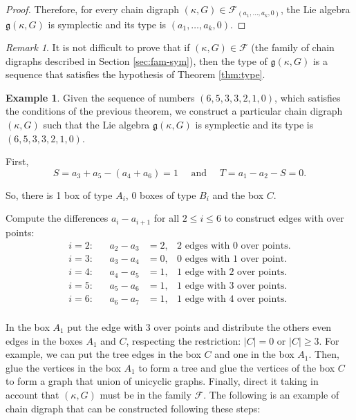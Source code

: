 \documentclass[a4paper,11pt]{amsart}
\theoremstyle{definition}
\newtheorem{example}[theorem]{Example}
\theoremstyle{remark}
\newtheorem{remark}[theorem]{Remark}
\numberwithin{equation}{section}
\newcommand{\g}{\mathfrak{g}}
\newcommand{\F}{\mathcal{F}}
\begin{document}
\begin{proof}
Therefore, for every chain digraph \((\kappa,G)\in\F_{(a_1,\dots,a_k,0)}\), the Lie algebra $\g(\kappa,G)$ is symplectic and its type is \((a_1,\dots,a_k,0)\).
\end{proof}


\begin{remark}
It is not difficult to prove that if \((\kappa,G)\in\mathcal{F}\) (the family of chain digraphs described in Section \ref{sec:fam-sym}), then the type of \(\g(\kappa,G)\) is a sequence that satisfies the hypothesis of Theorem \ref{thm:type}.
\end{remark}



\begin{example}
 Given the sequence of numbers $(6,5,3,3,2,1,0)$, 
 which satisfies the conditions of the previous theorem, we construct a particular chain digraph \((\kappa,G)\)  such that the Lie algebra \(\g(\kappa,G)\) is symplectic and its type is $(6,5,3,3,2,1,0)$.
 
 First,
\[S=a_3+a_5-(a_4+a_6)=1 \quad \text{ and } \quad T=a_1-a_2-S=0.\]

So, there is 1 box of type \(A_i\), 0 boxes of type \(B_i\) and the box \(C\).

Compute the differences $a_i - a_{i+1}$ for all $2\leq i\leq 6$ to construct edges with over points:
\begin{align*}
i=2:& & a_2-a_3 &= 2, &\text{2 edges with 0 over points.}\\
i=3:& & a_3 - a_4 &= 0, &\text{0 edges with 1 over point.} \\
i=4:& &a_4 - a_5 &= 1, &\text{1 edge with 2 over points.}\\
i=5:& &a_5 - a_6 &= 1, &\text{1 edge with 3 over points.}\\
i=6:& &a_6 - a_7 &= 1, &\text{1 edge with 4 over points.}\\
\end{align*}

In the box \(A_1\) put the edge with 3 over points and distribute the others even edges in the boxes \(A_1\) and \(C\), respecting the restriction: \(|C|=0\) or \(|C|\ge 3\). For example, we can put the tree edges in the box \(C\) and one in the box \(A_1\). Then, glue the vertices in the box \(A_1\) to form a tree and glue the vertices of the box \(C\) to form a graph that union of unicyclic graphs. Finally, direct it taking in account that \((\kappa,G)\) must be in the family \(\mathcal{F}\). The following is an example of chain digraph that can be constructed following these steps:


\end{example}
\end{document}
